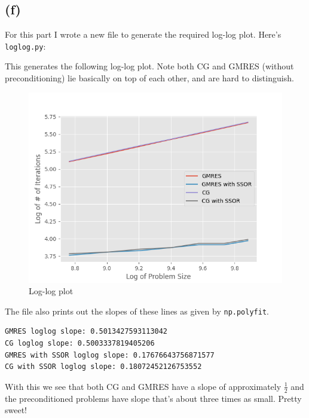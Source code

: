 \documentclass[boxes,pages]{homework}
\begin{document}
\begin{solution}
	\subsection*{(f)}
	For this part I wrote a new file to generate the required log-log plot. Here's \verb|loglog.py|:
	

	This generates the following log-log plot. Note both CG and GMRES (without preconditioning) lie basically on top of each other, and are hard to distinguish.

	\begin{figure}[h]
		\centering
		\includegraphics[width=\textwidth]{loglog.png}
		\caption{Log-log plot}
	\end{figure}

	The file also prints out the slopes of these lines as given by \texttt{np.polyfit}.

	\begin{verbatim}
GMRES loglog slope: 0.5013427593113042
CG loglog slope: 0.5003337819405206
GMRES with SSOR loglog slope: 0.17676643756871577
CG with SSOR loglog slope: 0.18072452126753552
\end{verbatim}

	With this we see that both CG and GMRES have a slope of approximately $\frac{1}{2}$ and the preconditioned problems have slope that's about three times as small. Pretty sweet!
\end{solution}
\end{document}
